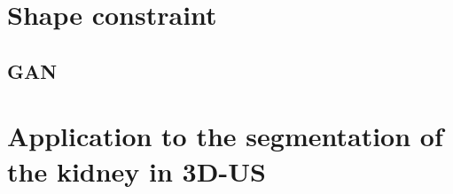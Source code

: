 \section{Shape constraint}

\subsection{GAN}

\section{Application to the segmentation of the kidney in 3D-US}
